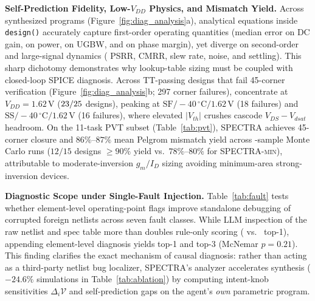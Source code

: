 \textbf{Self-Prediction Fidelity, Low-$V_{DD}$ Physics, and Mismatch Yield.} Across \NPrograms{} synthesized programs (Figure~\ref{fig:diag_analysis}a), analytical equations inside \texttt{design()} accurately capture first-order operating quantities (median error \PredGain{} on DC gain, \PredPower{} on power, \PredUGBW{} on UGBW, and \PredPM{} on phase margin), yet diverge on second-order and large-signal dynamics (\PredPSRR{} PSRR, \PredCMRR{} CMRR, \PredSlew{} slew rate, \PredNoise{} noise, and \PredSettle{} settling). This sharp dichotomy demonstrates why lookup-table sizing must be coupled with closed-loop SPICE diagnosis. Across \PVTFailDesigns{} TT-passing designs that fail 45-corner verification (Figure~\ref{fig:diag_analysis}b; 297 corner failures), \PVTFailLowVdd{} concentrate at $V_{DD}=1.62\,\mathrm{V}$ ($23/25{}$ designs), peaking at $\text{SF}/-40\,^\circ\mathrm{C}/1.62\,\mathrm{V}$ (18 failures) and $\text{SS}/-40\,^\circ\mathrm{C}/1.62\,\mathrm{V}$ (16 failures), where elevated $|V_{th}|$ crushes cascode $V_{DS}-V_{dsat}$ headroom. On the 11-task PVT subset (Table~\ref{tab:pvt}), \textsc{SPECTRA} achieves \PVTSpectra{} 45-corner closure and $86\%$--$87\%$ mean Pelgrom mismatch yield across \MCN{}-sample Monte Carlo runs ($12/15$ designs $\ge 90\%$ yield vs.\ $78\%$--$80\%$ for \textsc{SPECTRA-min}), attributable to moderate-inversion $g_m/I_D$ sizing avoiding minimum-area strong-inversion devices.

\textbf{Diagnostic Scope under Single-Fault Injection.} Table~\ref{tab:fault} tests whether element-level operating-point flags improve standalone debugging of \FaultN{} corrupted foreign netlists across seven fault classes. While LLM inspection of the raw netlist and spec table more than doubles rule-only scoring (\FaultRawTopOne{} vs.\ \FaultRuleTopOne{} top-1), appending element-level diagnosis yields \FaultDiagTopOne{} top-1 and \FaultDiagTopThree{} top-3 (McNemar $p=0.21$). This finding clarifies the exact mechanism of causal diagnosis: rather than acting as a third-party netlist bug localizer, \textsc{SPECTRA}'s analyzer accelerates synthesis ($-24.6\%$ simulations in Table~\ref{tab:ablation}) by computing intent-knob sensitivities $\Delta_i \mathcal{V}$ and self-prediction gaps on the agent's \emph{own} parametric program.

